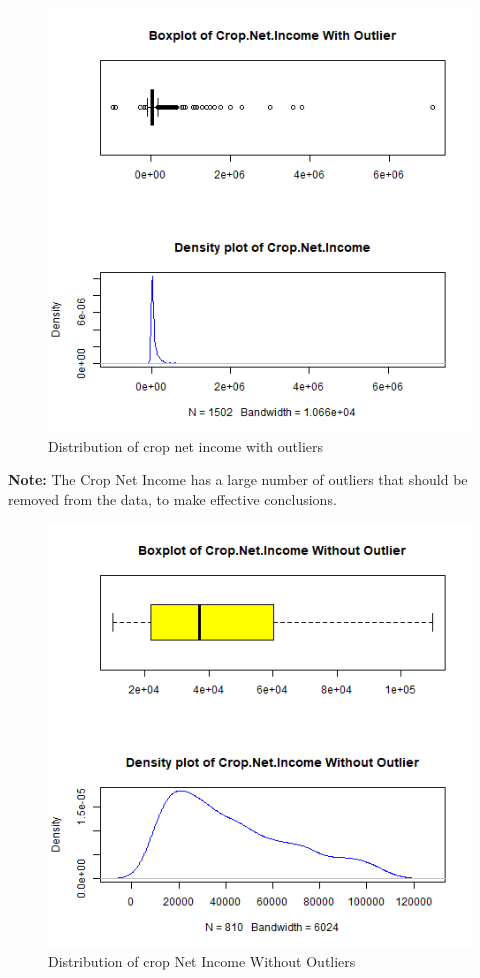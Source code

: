 \documentclass[12pt, a4paper]{article}
\begin{document}
\begin{figure}[H]
\centering
\includegraphics[trim={0 0 0 2cm}, scale=0.5, clip]{Income.png}
\caption{Distribution of crop net income with outliers}
\end{figure}

\justify
\textbf{Note: } The Crop Net Income has a large number of outliers that should be removed from the data, to make effective conclusions.

\begin{figure}[H]
\centering
\includegraphics[trim={0 0 0 2cm}, scale=0.5, clip]{income2.png}
\caption{Distribution of crop Net Income Without Outliers}
\end{figure}
\end{document}
